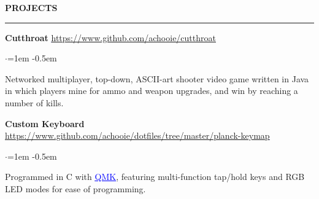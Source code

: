 \documentclass[10pt, a4paper]{article}
\newenvironment{aSection}[1]{
    \medskip \textbf{\uppercase{#1}}
    \smallskip
    \hrule
    \begin{list}{}{
            \setlength{\leftmargin}{1.5em}
        }
    \item[]
    }{
    \end{list}
}
\newenvironment{pSubsection}[2]{
    {#1} \hfill {#2}
    \smallskip
    \begin{list}{$\cdot$}{\leftmargin=1em}
    \itemsep -0.5em \vspace{-0.5em}
    }{
    \end{list}
    \vspace{0.5em}
}
\begin{document}
\begin{aSection}{Projects}
    \begin{pSubsection}
        {\textbf{Cutthroat}}
        {\textcolor{blue}{\underline{\url{https://www.github.com/achooie/cutthroat}}}}
    \item[] Networked multiplayer, top-down, ASCII-art shooter video game written in Java in which
        players mine for ammo and weapon upgrades, and win by reaching a number of kills.
    \end{pSubsection}

    \begin{pSubsection}
        {\textbf{Custom Keyboard}}
        {\textcolor{blue}{\underline{
            \url{https://www.github.com/achooie/dotfiles/tree/master/planck-keymap}
        }}}
    \item[] Programmed in C with
        \href{https://github.com/qmk/qmk_firmware}{\textcolor{blue}{\underline{QMK}}}, featuring
        multi-function tap/hold keys and RGB LED modes for ease of programming.
    \end{pSubsection}
\end{aSection}
\end{document}
